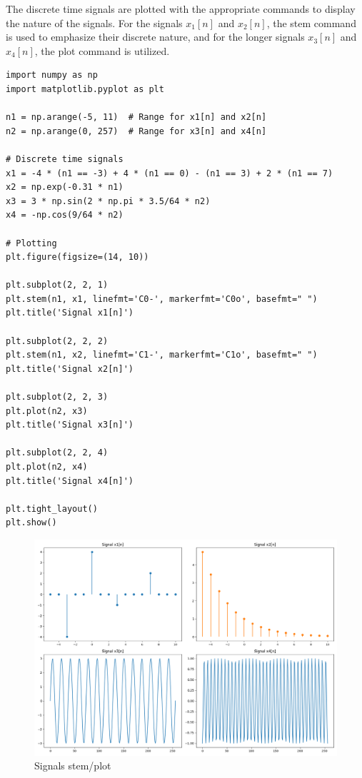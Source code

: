 
\item[(a)]
The discrete time signals are plotted with the appropriate commands to display the nature of the signals.
For the signals $x_{1}[n]$ and $x_{2}[n]$, the stem command is used to emphasize their discrete nature,
and for the longer signals $x_{3}[n]$ and $x_{4}[n]$, the plot command is utilized.

\begin{verbatim}
import numpy as np
import matplotlib.pyplot as plt

n1 = np.arange(-5, 11)  # Range for x1[n] and x2[n]
n2 = np.arange(0, 257)  # Range for x3[n] and x4[n]

# Discrete time signals
x1 = -4 * (n1 == -3) + 4 * (n1 == 0) - (n1 == 3) + 2 * (n1 == 7)
x2 = np.exp(-0.31 * n1)
x3 = 3 * np.sin(2 * np.pi * 3.5/64 * n2)
x4 = -np.cos(9/64 * n2)

# Plotting
plt.figure(figsize=(14, 10))

plt.subplot(2, 2, 1)
plt.stem(n1, x1, linefmt='C0-', markerfmt='C0o', basefmt=" ")
plt.title('Signal x1[n]')

plt.subplot(2, 2, 2)
plt.stem(n1, x2, linefmt='C1-', markerfmt='C1o', basefmt=" ")
plt.title('Signal x2[n]')

plt.subplot(2, 2, 3)
plt.plot(n2, x3)
plt.title('Signal x3[n]')

plt.subplot(2, 2, 4)
plt.plot(n2, x4)
plt.title('Signal x4[n]')

plt.tight_layout()
plt.show()
\end{verbatim}

\begin{figure}[h]
\centering
\includegraphics[width=\textwidth]{fig/ex1_a_plot}
\caption{Signals stem/plot}
\label{fig:ex1_a_plot}
\end{figure}


